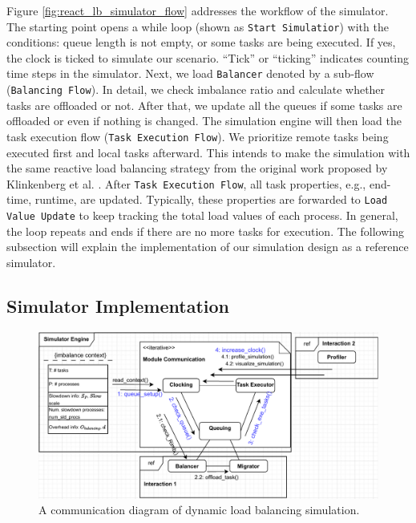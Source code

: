 Figure \ref{fig:react_lb_simulator_flow} addresses the workflow of the simulator. The starting point opens a while loop (shown as \texttt{Start Simulatior}) with the conditions: queue length is not empty, or some tasks are being executed. If yes, the clock is ticked to simulate our scenario. ``Tick'' or ``ticking'' indicates counting time steps in the simulator. Next, we load \texttt{Balancer} denoted by a sub-flow (\texttt{Balancing Flow}). In detail, we check imbalance ratio and calculate whether tasks are offloaded or not. After that, we update all the queues if some tasks are offloaded or even if nothing is changed. The simulation engine will then load the task execution flow (\texttt{Task Execution Flow}). We prioritize remote tasks being executed first and local tasks afterward. This intends to make the simulation with the same reactive load balancing strategy from the original work proposed by Klinkenberg et al. \cite{Klinkenberg2020ChameleonReactLB}. After \texttt{Task Execution Flow}, all task properties, e.g., end-time, runtime, are updated. Typically, these properties are forwarded to \texttt{Load Value Update} to keep tracking the total load values of each process. In general, the loop repeats and ends if there are no more tasks for execution. The following subsection will explain the implementation of our simulation design as a reference simulator.

\subsection{Simulator Implementation}
\label{subsec:Simulator-Implementation}

\begin{figure}[t]
  \centering
  \includegraphics[scale=0.7]{./pictures/perf_analysis_model/perf_simulator_comm_diagram.pdf}
	\caption{A communication diagram of dynamic load balancing simulation.}
	\label{fig:simulator_comm_diagram}
\end{figure}

